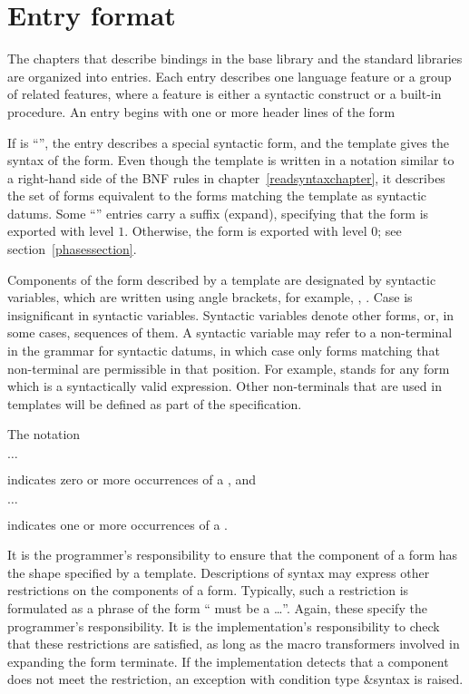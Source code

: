 \section{Entry format}

The chapters that describe bindings in the base library and the standard
libraries are organized
into entries.  Each entry describes one language feature or a group of
related features, where a feature is either a syntactic construct or a
built-in procedure.  An entry begins with one or more header lines of the form

\noindent{}\unpenalty

If  is ``\exprtype'', the entry describes a 
special syntactic form, and the template gives the syntax of the form.  Even
though the template is written in a notation similar to a right-hand
side of the BNF rules in chapter~\ref{readsyntaxchapter}, it describes
the set of forms equivalent to the forms matching the
template as syntactic datums.  Some ``\exprtype'' entries carry a
suffix ({\cf expand}), specifying that the form is exported with level
$1$.  Otherwise, the form is exported with level $0$; see
section~\ref{phasessection}.

Components of the form described by a template are designated
by syntactic variables, which are written using angle brackets, for
example, , .  Case is insignificant
in syntactic variables.  Syntactic variables
denote other forms, or, in some cases,
sequences of them.  A syntactic variable may refer to a non-terminal
in the grammar for syntactic datums, in which case only forms matching
that non-terminal are permissible in that position.  For example,
 stands for any form which is a
syntactically valid expression.  Other non-terminals that are used in
templates will be defined as part of the specification.

The notation
\begin{tabbing}
\qquad {} $\ldots$
\end{tabbing}
indicates zero or more occurrences of a , and
\begin{tabbing}
\qquad {}  $\ldots$
\end{tabbing}
indicates one or more occurrences of a .

It is the programmer's responsibility to ensure that the component of
a form has the shape specified by a template.  Descriptions of syntax
may express other restrictions on the components of a form.
Typically, such a restriction is formulated as a phrase of the form
`` must be a \ldots''.  Again, these
specify the programmer's responsibility.  It is the implementation's
responsibility to check that these restrictions are satisfied, as long
as the macro transformers involved in expanding the form terminate.
If the implementation detects that a component does not meet the
restriction, an exception with condition type {\cf\&syntax} is raised.


